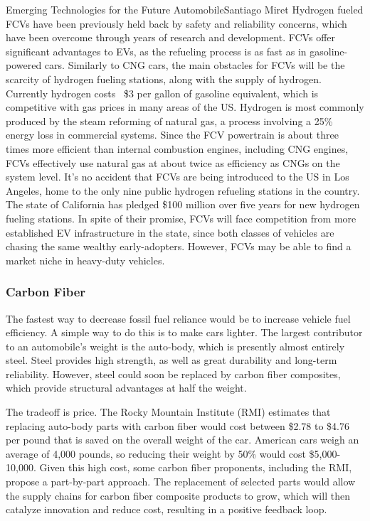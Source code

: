 \documentclass[10pt]{papertex}
\begin{document}
\begin{news}{2}{Emerging Technologies for the Future Automobile}{Santiago Miret}{}{}
Hydrogen fueled FCVs have been previously held back by safety and reliability
concerns, which have been overcome through years of research and development.
FCVs offer significant advantages to EVs, as the refueling process is as fast as
in gasoline-powered cars. Similarly to CNG cars, the main obstacles for FCVs
will be the scarcity of hydrogen fueling stations, along with the supply of
hydrogen. Currently hydrogen costs ~\$3 per gallon of gasoline equivalent, which
is competitive with gas prices in many areas of the US. Hydrogen is most
commonly produced by the steam reforming of natural gas, a process involving a
25\% energy loss in commercial systems. Since the FCV powertrain is about three
times more efficient than internal combustion engines, including CNG engines,
FCVs effectively use natural gas at about twice as efficiency as CNGs on the
system level. It's no accident that FCVs are being introduced to the US in Los
Angeles, home to the only nine public hydrogen refueling stations in the
country. The state of California has pledged \$100 million over five years for
new hydrogen fueling stations. In spite of their promise, FCVs will face
competition from more established EV infrastructure in the state, since both
classes of vehicles are chasing the same wealthy early-adopters. However, FCVs
may be able to find a market niche in heavy-duty vehicles.


\subsubsection*{Carbon Fiber}

The fastest way to decrease fossil fuel reliance would be to increase vehicle
fuel efficiency. A simple way to do this is to make cars lighter. The largest
contributor to an automobile's weight is the auto-body, which is presently
almost entirely steel. Steel provides high strength, as well as great durability
and long-term reliability. However, steel could soon be replaced by carbon fiber
composites, which provide structural advantages at half the weight.

The tradeoff is price. The Rocky Mountain Institute (RMI) estimates that
replacing auto-body parts with carbon fiber would cost between \$2.78 to \$4.76
per pound that is saved on the overall weight of the car. American cars weigh an
average of 4,000 pounds, so reducing their weight by 50\% would cost
\$5,000-10,000. Given this high cost, some carbon fiber proponents, including
the RMI, propose a part-by-part approach. The replacement of selected parts
would allow the supply chains for carbon fiber composite products to grow, which
will then catalyze innovation and reduce cost, resulting in a positive feedback
loop.


\end{news}
\end{document}
